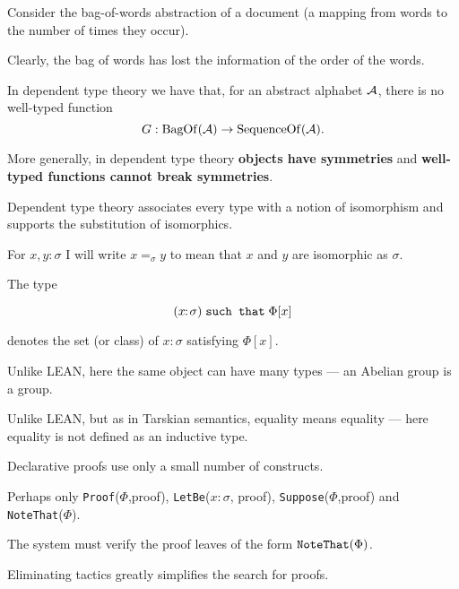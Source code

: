 {

Consider the bag-of-words abstraction of a document (a mapping from words to the number of times they occur).

\vfill
Clearly, the bag of words has lost the information of the order of the words.

\vfill
In dependent type theory we have that, for an abstract alphabet ${\cal A}$, there is no well-typed function
$$G:\mathrm{BagOf}({\cal A}) \rightarrow \mathrm{SequenceOf}({\cal A}).$$

\vfill
More generally, in dependent type theory {\bf objects have symmetries} and {\bf well-typed functions cannot break symmetries}.


Dependent type theory associates every type with a notion of isomorphism and supports the substitution of isomorphics.

\vfill
For $x,y\!\!:\!\!\sigma$ I will write $x =_\sigma y$ to mean that $x$ and $y$ are isomorphic as $\sigma$.

\centerline{
  {}}


The type

$$(x\!\!:\!\sigma)\; \mbox{\tt such that}\; \Phi[x]$$

\vfill
denotes the set (or class) of $x\!:\!\sigma$ satisfying $\Phi[x]$.

\vfill
Unlike LEAN, here the same object can have many types --- an Abelian group is a group.

\vfill
Unlike LEAN, but as in Tarskian semantics, equality means equality --- here equality is not defined as an inductive type.



Declarative proofs use only a small number of constructs.

\vfill
Perhaps only {\huge {\tt Proof}($\Phi$,proof)}, {\huge{\tt LetBe}($x\!\!:\!\!\sigma$, proof)}, {\huge {\tt Suppose}($\Phi$,proof)}
and {\huge {\tt NoteThat}($\Phi$)}.

\vfill
The system must verify the proof leaves of the form ${\tt NoteThat}(\Phi)$.

\vfill
Eliminating tactics greatly simplifies the search for proofs.

}
